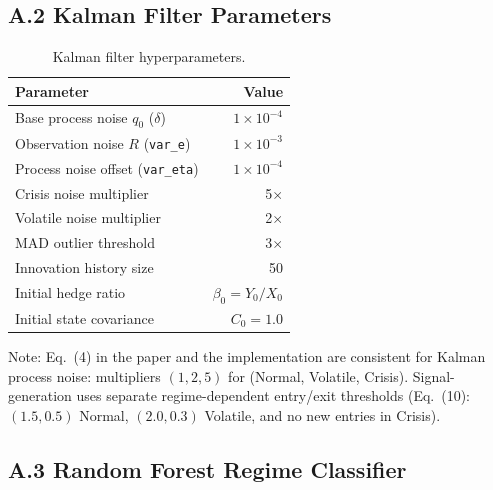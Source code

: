 \documentclass[conference]{IEEEtran}
\begin{document}
\subsection{A.2 Kalman Filter Parameters}

\begin{table}[h]
\centering
\caption{Kalman filter hyperparameters.}
\label{tab:supp_kalman}
\small
\begin{tabular}{lr}
\toprule
Parameter & Value \\
\midrule
Base process noise $q_0$ ($\delta$) & $1 \times 10^{-4}$ \\
Observation noise $R$ (\texttt{var\_e}) & $1 \times 10^{-3}$ \\
Process noise offset (\texttt{var\_eta}) & $1 \times 10^{-4}$ \\
Crisis noise multiplier & 5$\times$ \\
Volatile noise multiplier & 2$\times$ \\
MAD outlier threshold & 3$\times$ \\
Innovation history size & 50 \\
Initial hedge ratio & $\beta_0 = Y_0 / X_0$ \\
Initial state covariance & $C_0 = 1.0$ \\
\bottomrule
\end{tabular}
\end{table}

Note: Eq.~(4) in the paper and the implementation are consistent for
Kalman process noise: multipliers $(1,2,5)$ for (Normal, Volatile, Crisis).
Signal-generation uses separate regime-dependent entry/exit thresholds
(Eq.~(10): $(1.5,0.5)$ Normal, $(2.0,0.3)$ Volatile, and no new entries in Crisis).

\subsection{A.3 Random Forest Regime Classifier}
\end{document}
